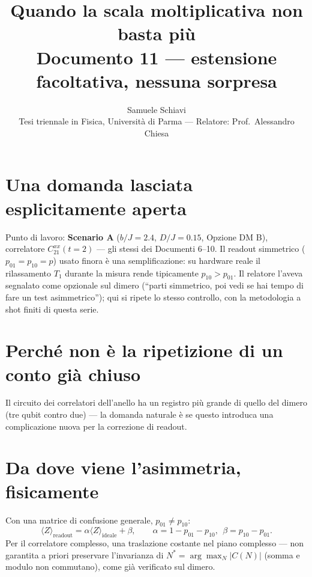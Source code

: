 \documentclass[11pt,a4paper]{article}
\title{\bfseries Quando la scala moltiplicativa non basta più\\[2pt]
\large Documento 11 --- estensione facoltativa, nessuna sorpresa}
\author{Samuele Schiavi \\ \small Tesi triennale in Fisica, Università di Parma
--- Relatore: Prof.\ Alessandro Chiesa}
\date{}
\begin{document}
\maketitle
\thispagestyle{fancy}

\section{Una domanda lasciata esplicitamente aperta}

Punto di lavoro: \textbf{Scenario A} ($b/J=2.4$, $D/J=0.15$, Opzione DM B),
correlatore $C_{21}^{xx}(t{=}2)$ --- gli stessi dei Documenti 6--10. Il
readout simmetrico ($p_{01}=p_{10}=p$) usato finora è una
semplificazione: su hardware reale il rilassamento $T_1$ durante la misura
rende tipicamente $p_{10}>p_{01}$. Il relatore l'aveva segnalato come
opzionale sul dimero (``parti simmetrico, poi vedi se hai tempo di fare un
test asimmetrico''); qui si ripete lo stesso controllo, con la
metodologia a shot finiti di questa serie.

\section{Perché non è la ripetizione di un conto già chiuso}

Il circuito dei correlatori dell'anello ha un registro più grande di
quello del dimero (tre qubit contro due) --- la domanda naturale è se
questo introduca una complicazione nuova per la correzione di readout.


\section{Da dove viene l'asimmetria, fisicamente}

Con una matrice di confusione generale, $p_{01}\neq p_{10}$:
$$\langle Z\rangle_\text{readout} = \alpha\langle Z\rangle_\text{ideale}+\beta,
\qquad \alpha=1-p_{01}-p_{10},\ \ \beta=p_{10}-p_{01}.$$
Per il correlatore complesso, una traslazione costante nel piano
complesso --- non garantita a priori preservare l'invarianza di
$N^*=\arg\max_N|C(N)|$ (somma e modulo non commutano), come già verificato
sul dimero.
\end{document}
